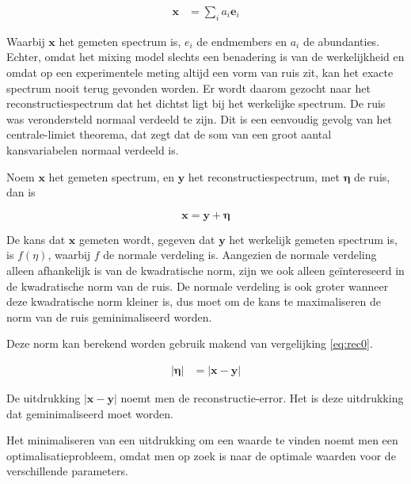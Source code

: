 \documentclass[12pt]{report}
\begin{document}


\begin{align}
\bm{x} &= \sum_i a_i \bm{e}_i \label{eq:nq}
\end{align}

Waarbij $\bm{x}$ het gemeten spectrum is, $e_i$ de endmembers en  $a_i$ de abundanties.
Echter, omdat het mixing model slechts een benadering is van de werkelijkheid en omdat op een experimentele meting altijd een vorm van ruis zit, kan het exacte spectrum nooit terug gevonden worden. Er wordt daarom gezocht naar het reconstructiespectrum dat het dichtst ligt bij het werkelijke spectrum. De ruis was verondersteld normaal verdeeld te zijn. Dit is een eenvoudig gevolg van het centrale-limiet theorema, dat zegt dat de som van een groot aantal kansvariabelen normaal verdeeld is. 

Noem $\bm{x}$ het gemeten spectrum, en $\bm{y}$ het reconstructiespectrum, met $\bm{\eta}$ de ruis, dan is

\begin{equation}\label{eq:rec0}
\bm{x} = \bm{y} + \bm{\eta}
\end{equation}

De kans dat $\bm{x}$ gemeten wordt, gegeven dat $\bm{y}$ het werkelijk gemeten spectrum is, is $f(\eta)$, waarbij $f$ de normale verdeling is. Aangezien de normale verdeling alleen afhankelijk is van de kwadratische norm, zijn we ook alleen ge\"intereseerd in de kwadratische norm van de ruis. De normale verdeling is ook groter wanneer deze kwadratische norm kleiner is, dus moet om de kans te maximaliseren de norm van de ruis geminimaliseerd worden. 

Deze norm kan berekend worden gebruik makend van vergelijking \ref{eq:rec0}.

\begin{eqnarray}
\left|\bm{\eta}\right| &= \left|\bm{x} - \bm{y}\right| \label{eq:rec}
\end{eqnarray}

De uitdrukking $\left|\bm{x} - \bm{y}\right|$ noemt men de reconstructie-error. Het is deze uitdrukking dat geminimaliseerd moet worden. 

Het minimaliseren van een uitdrukking om een waarde te vinden noemt men een optimalisatieprobleem, omdat men op zoek is naar de optimale waarden voor de verschillende parameters.
\end{document}
